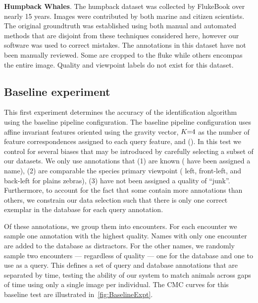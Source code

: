 \begin{itemln}
            \item \textbf{Humpback Whales}.
            The humpback dataset was collected by FlukeBook over nearly 15 years.
            Images were contributed by both marine and citizen scientists.
            The original groundtruth was established using both manual and automated methods that are disjoint
              from these techniques considered here, however our software was used to correct mistakes.
            The annotations in this dataset have not been manually reviewed.
            Some are cropped to the fluke while others encompas the entire image.
            Quality and viewpoint labels do not exist for this dataset.
        \end{itemln}

    \subsection{Baseline experiment}\label{sub:exptbase}
      
        \BaselineExpt{}

        This first experiment determines the accuracy of the identification algorithm using the baseline pipeline
          configuration.
        The baseline pipeline configuration uses affine invariant features oriented using the gravity vector,
          $K\mkern-6mu=\mkern-6mu4$ as the number of feature correspondences assigned to each query feature, and \nscoring{}
          (\nsum{}).
        In this test we control for several biases that may be introduced by carefully selecting a subset of our
          datasets.
        We only use annotations that
        (1) are known (\ie{} have been assigned a name),
        (2) are comparable the species primary viewpoint (\eg{} left, front-left, and back-left for plains
          zebras),
        (3) have not been assigned a quality of ``junk''.
        Furthermore, to account for the fact that some \names{} contain more annotations than others, we
          constrain our data selection such that there is only one correct exemplar in the database for each query
          annotation.

        Of these annotations, we group them into encounters.
        For each encounter we sample one annotation with the highest quality.
        Names with only one encounter are added to the database as distractors.
        For the other names, we randomly sample two encounters --- regardless of quality --- one for the database
          and one to use as a query.
        This defines a set of query and database annotations that are separated by time, testing the ability of
          our system to match animals across gaps of time using only a single image per individual.
        The CMC curves for this baseline test are illustrated in~\cref{fig:BaselineExpt}.

